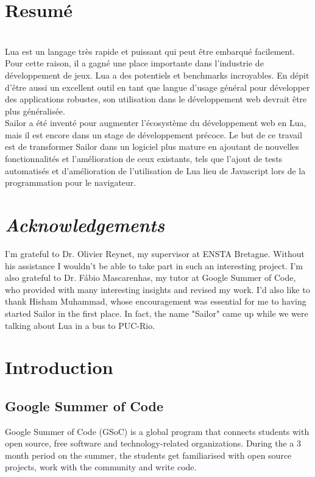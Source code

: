 \documentclass{article}
\begin{document}
	\section*{Resumé}\\

Lua est un langage très rapide et puissant qui peut être embarqué facilement. Pour cette raison, il a gagné une place importante dans l'industrie de développement de jeux. Lua a des potentiels et benchmarks incroyables. En dépit d'être aussi un excellent outil en tant que langue d'usage général pour développer des applications robustes, son utilisation dans le développement web devrait être plus généralisée.\\

Sailor a été inventé pour augmenter l'écosystème du développement web en Lua, mais il est encore dans un stage de développement précoce. Le but de ce travail est de transformer Sailor dans un logiciel plus mature en ajoutant de nouvelles fonctionnalités et l'amélioration de ceux existants, tels que l'ajout de tests automatisés et d'amélioration de l'utilisation de Lua lieu de Javascript lors de la programmation pour le navigateur.

\null\newpage
\null\newpage


\section*{ \textit{Acknowledgements}}

I'm grateful to Dr. Olivier Reynet, my supervisor at ENSTA Bretagne. Without his assistance I wouldn't be able to take part in such an interesting project. I'm also grateful to Dr. Fábio Mascarenhas, my tutor at Google Summer of Code, who provided with many interesting insights and revised my work. I'd also like to thank Hisham Muhammad, whose encouragement was essential for me to having started Sailor in the first place. In fact, the name "Sailor" came up while we were talking about Lua in a bus to PUC-Rio. 


\null\newpage
\null\newpage


	\tableofcontents

\null\newpage
\null\newpage


	
	\section{Introduction}

	\subsection{Google Summer of Code}
	Google Summer of Code (GSoC) is a global program that connects students with open source, free software and technology-related organizations. During the a 3 month period on the summer, the students get familiarised with open source projects, work with the community and write code. \\
\end{document}
